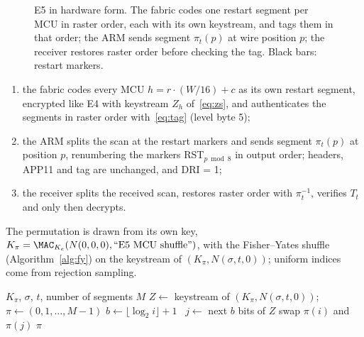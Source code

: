 \begin{figure}[t]
\centering
\resizebox{\columnwidth}{!}{}
\caption{E5 in hardware form. The fabric codes one restart segment per MCU in raster order, each with its own keystream, and tags them in that order; the ARM sends segment $\pi_t(p)$ at wire position $p$; the receiver restores raster order before checking the tag. Black bars: restart markers.}
\label{fig:e5}
\end{figure}

\begin{enumerate}
\item the fabric codes every MCU $h = r \cdot (W/16) + c$ as its own restart segment, encrypted like E4 with keystream $Z_h$ of~\eqref{eq:zs}, and authenticates the segments in raster order with~\eqref{eq:tag} (level byte 5);
\item the ARM splits the scan at the restart markers and sends segment $\pi_t(p)$ at position $p$, renumbering the markers RST$_{p \bmod 8}$ in output order; headers, APP11 and tag are unchanged, and DRI = 1;
\item the receiver splits the received scan, restores raster order with $\pi_t^{-1}$, verifies $T_t$ and only then decrypts.
\end{enumerate}
The permutation is drawn from its own key, $K_\pi = \MAC_{K_e}(N(0,0,0), \text{``E5 MCU shuffle''})$, with the Fisher--Yates shuffle (Algorithm~\ref{alg:fy}) on the keystream of $(K_\pi, N(\sigma, t, 0))$; uniform indices come from rejection sampling.

\begin{algorithm}[t]
\caption{E5 order $\pi_t$ (ARM core and receiver)}
\label{alg:fy}
\begin{algorithmic}[1]
\Require $K_\pi$, $\sigma$, $t$, number of segments $M$
\State $Z \gets$ keystream of $(K_\pi, N(\sigma, t, 0))$; $\pi \gets (0, 1, \ldots, M-1)$
  \State $b \gets \lfloor \log_2 i \rfloor + 1$ 
  \Repeat \ $j \gets$ next $b$ bits of $Z$ 
  \State swap $\pi(i)$ and $\pi(j)$
\EndFor
\State \Return $\pi$ 
\end{algorithmic}
\end{algorithm}

